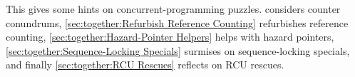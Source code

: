 
%


This 
gives some hints on concurrent-programming puzzles.
considers counter conundrums,
\cref{sec:together:Refurbish Reference Counting}
refurbishes reference counting,
\cref{sec:together:Hazard-Pointer Helpers}
helps with hazard pointers,
\cref{sec:together:Sequence-Locking Specials}
surmises on sequence-locking specials,
and finally
\cref{sec:together:RCU Rescues}
reflects on RCU rescues.







